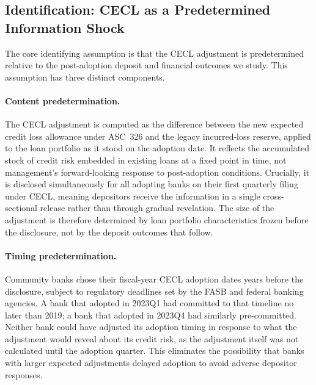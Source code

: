 \subsection{Identification: CECL as a Predetermined Information Shock}
\label{sec:identification:predetermination}

The core identifying assumption is that the CECL adjustment is predetermined
relative to the post-adoption deposit and financial outcomes we study. This
assumption has three distinct components.

\paragraph{Content predetermination.}
The CECL adjustment is computed as the difference between the new expected credit
loss allowance under ASC~326 and the legacy incurred-loss reserve, applied to
the loan portfolio as it stood on the adoption date. It reflects the accumulated
stock of credit risk embedded in existing loans at a fixed point in time, not
management's forward-looking response to post-adoption conditions. Crucially, it
is disclosed simultaneously for all adopting banks on their first quarterly
filing under CECL, meaning depositors receive the information in a single
cross-sectional release rather than through gradual revelation. The size of the
adjustment is therefore determined by loan portfolio characteristics frozen before
the disclosure, not by the deposit outcomes that follow.

\paragraph{Timing predetermination.}
Community banks chose their fiscal-year CECL adoption dates years before the
disclosure, subject to regulatory deadlines set by the FASB and federal banking
agencies. A bank that adopted in 2023Q1 had committed to that timeline no later
than 2019; a bank that adopted in 2023Q4 had similarly pre-committed. Neither
bank could have adjusted its adoption timing in response to what the adjustment
would reveal about its credit risk, as the adjustment itself was not calculated
until the adoption quarter. This eliminates the possibility that banks with
larger expected adjustments delayed adoption to avoid adverse depositor responses.

